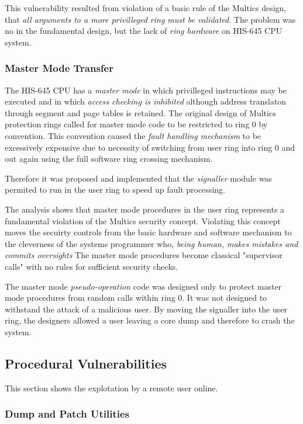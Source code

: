 This vulnerability resulted from violation of a basic rule of the Multics design, that \textit{all arguments to a more 
privilleged ring must be validated}.
The problem was no in the fundamental design, but the lack of \textit{ring hardware} on HIS-645 CPU system.

\subsubsection{Master Mode Transfer}

The HIS-645 CPU has a \textit{master mode} in which privilleged instructions may be executed and in 
which \textit{access checking is inhibited} although address translaton through segment and page 
tables is retained. 
The original design of Multics protection rings called for master mode code to be restricted to ring 0 by convention.
This convention caused the \textit{fault handling mechanism} to be excessively expensive due to necessity of switching
from user ring into ring 0 and out again using the full software ring crossing mechanism.

Therefore it was proposed and implemented that the \textit{signaller} module  was permited to run in the user 
ring to speed up fault processing.

The analysis shows that master mode procedures in the user ring represents a fundamental violation of the Multics 
security concept. Violating this concept moves the secuirty controls from the basic hardware and software mechanism 
to the cleverness of the systems programmer who, \textit{being human, makes mistakes and commits oversights}
The master mode procedures become classical "supervisor calls" with no rules for sufficient security checks.

The master mode \textit{pseudo-operation} code was designed only to protect master mode procedures from random calls 
within ring 0. It was not designed to withstand the attack of a malicious user. By moving the signaller into the user 
ring, the designers allowed a user leaving a core dump and therefore to crash the system.

\subsection{Procedural Vulnerabilities}

This section shows the explotation by a remote user online.

\subsubsection{Dump and Patch Utilities}

